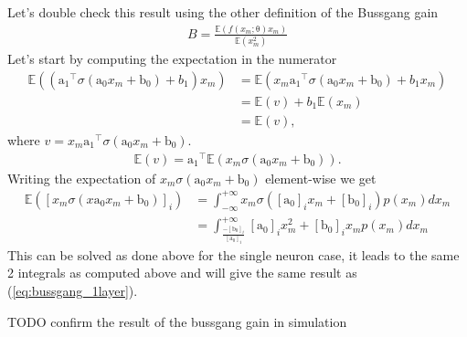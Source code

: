 \documentclass[12pt]{article}
\newcommand{\vect}[1]{\boldsymbol{\mathrm{#1}}}
\newcommand{\TODO}[1]{{\color{red} TODO {#1}}}
\newcommand{\expt}[1]{\mathbb{E}\left(#1\right)}
\theoremstyle{remark}
\begin{document}
Let's double check this result using the other definition of the Bussgang gain
\begin{align}
	B = \frac{\expt{f(x_m;\vect{\theta})x_m}}{\expt{x_m^2}} 
\end{align}
Let's start by computing the expectation in the numerator
\begin{align}
	\expt{(\vect{a_1}^{\intercal}\sigma(\vect{a_0}x_m + \vect{b_0}) + b_1) x_m} &= \expt{x_m \vect{a_1}^{\intercal}\sigma(\vect{a_0}x_m + \vect{b_0}) + b_1 x_m}\\
	&= \expt{v} + b_1 \expt{x_m}\\
	&= \expt{v},
\end{align}
where $v=x_m \vect{a_1}^{\intercal}\sigma(\vect{a_0}x_m + \vect{b_0})$. 
\begin{align}
	\expt{v} = \vect{a_1}^{\intercal} \expt{x_m \sigma(\vect{a_0}x_m + \vect{b_0})}.
\end{align}
Writing the expectation of $x_m \sigma(\vect{a_0}x_m + \vect{b_0})$ element-wise we get 
\begin{align}
	\expt{[x_m \sigma(x\vect{a_0}x_m + \vect{b_0})]_i} &= \int_{-\infty}^{+\infty} x_m \sigma([\vect{a_0}]_i x_m + [\vect{b_0}]_i) p(x_m) dx_m\\
	&= \int_{\frac{-[\vect{b_0}]_i}{[\vect{a_0}]_i}}^{+\infty} [\vect{a_0}]_i x_m^2 + [\vect{b_0}]_i x_m p(x_m) dx_m
\end{align}
This can be solved as done above for the single neuron case, it leads to the same 2 integrals as computed above and will give the same result as (\ref{eq:bussgang_1layer}).

\TODO{confirm the result of the bussgang gain in simulation}
\end{document}
